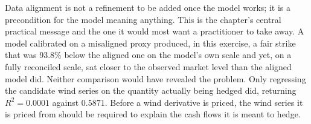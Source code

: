 \documentclass[11pt, a4paper, twoside]{article}
\begin{document}
Data alignment is not a refinement to be added once the model works; it is a precondition for the model meaning anything. This is the chapter's central practical message and the one it would most want a practitioner to take away. A model calibrated on a misaligned proxy produced, in this exercise, a fair strike that was 93.8\% below the aligned one on the model's own scale and yet, on a fully reconciled scale, sat closer to the observed market level than the aligned model did. Neither comparison would have revealed the problem. Only regressing the candidate wind series on the quantity actually being hedged did, returning $R^2 = 0.0001$ against $0.5871$. Before a wind derivative is priced, the wind series it is priced from should be required to explain the cash flows it is meant to hedge.

\newpage

\end{document}

